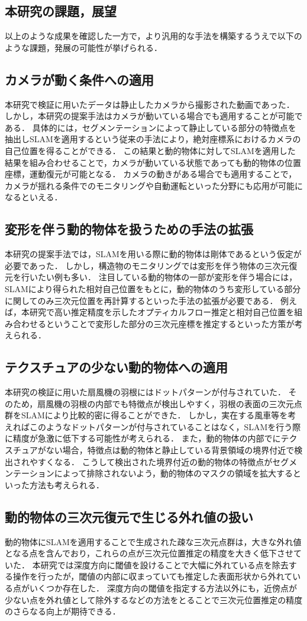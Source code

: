 \subsection{本研究の課題，展望}\label{subsec:obstacles}
以上のような成果を確認した一方で，より汎用的な手法を構築するうえで以下のような課題，発展の可能性が挙げられる．
\subsection*{カメラが動く条件への適用}

本研究で検証に用いたデータは静止したカメラから撮影された動画であった．
しかし，本研究の提案手法はカメラが動いている場合でも適用することが可能である．
具体的には，セグメンテーションによって静止している部分の特徴点を抽出しSLAMを適用するという従来の手法により，絶対座標系におけるカメラの自己位置を得ることができる．
この結果と動的物体に対してSLAMを適用した結果を組み合わせることで，カメラが動いている状態であっても動的物体の位置座標，運動復元が可能となる．
カメラの動きがある場合でも適用することで，カメラが揺れる条件でのモニタリングや自動運転といった分野にも応用が可能になるといえる．
\subsection*{変形を伴う動的物体を扱うための手法の拡張}

本研究の提案手法では，SLAMを用いる際に動的物体は剛体であるという仮定が必要であった．
しかし，構造物のモニタリングでは変形を伴う物体の三次元復元を行いたい例も多い．
注目している動的物体の一部が変形を伴う場合には，SLAMにより得られた相対自己位置をもとに，動的物体のうち変形している部分に関してのみ三次元位置を再計算するといった手法の拡張が必要である．
例えば，本研究で高い推定精度を示したオプティカルフロー推定と相対自己位置を組み合わせるということで変形した部分の三次元座標を推定するといった方策が考えられる．

\subsection*{テクスチュアの少ない動的物体への適用}

本研究の検証に用いた扇風機の羽根にはドットパターンが付与されていた．
そのため，扇風機の羽根の内部でも特徴点が検出しやすく，羽根の表面の三次元点群をSLAMにより比較的密に得ることができた．
しかし，実在する風車等を考えればこのようなドットパターンが付与されていることはなく，SLAMを行う際に精度が急激に低下する可能性が考えられる．
また，動的物体の内部でにテクスチュアがない場合，特徴点は動的物体と静止している背景領域の境界付近で検出されやすくなる．
こうして検出された境界付近の動的物体の特徴点がセグメンテーションによって排除されないよう，動的物体のマスクの領域を拡大するといった方法も考えられる．
\subsection*{動的物体の三次元復元で生じる外れ値の扱い}

動的物体にSLAMを適用することで生成された疎な三次元点群は，大きな外れ値となる点を含んでおり，これらの点が三次元位置推定の精度を大きく低下させていた．
本研究では深度方向に閾値を設けることで大幅に外れている点を除去する操作を行ったが，閾値の内部に収まっていても推定した表面形状から外れている点がいくつか存在した．
深度方向の閾値を指定する方法以外にも，近傍点が少ない点を外れ値として除外するなどの方法をとることで三次元位置推定の精度のさらなる向上が期待できる．